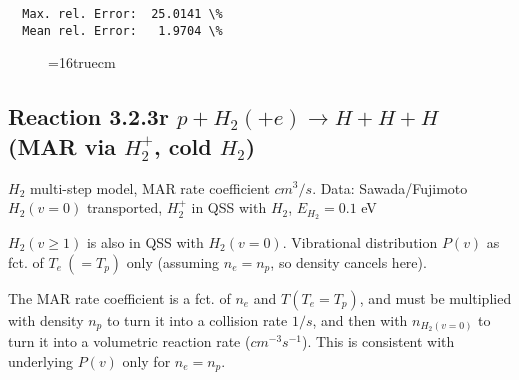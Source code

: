 \documentclass[12pt,dvipdfmx]{article}
\begin{document}
\begin{small}
\begin{verbatim}
  Max. rel. Error:  25.0141 \%
  Mean rel. Error:   1.9704 \%

\end{verbatim}\end{small}
\begin{figure} \label{2.3.18B1}
\epsfxsize=16truecm
\end{figure}
\newpage

\subsection{
Reaction 3.2.3r   $p + H_2 (+e)   \rightarrow H + H + H  $ (MAR via $H_2^+$, cold $H_2$)
}

$H_2$ multi-step model, MAR rate coefficient $cm^3/s$.
Data: Sawada/Fujimoto \cite{kn:Sawada}
$H_2(v=0)$ transported, $H_2^+$ in QSS with $H_2$, $E_{H_2}=0.1$ eV

$H_2(v\geq 1)$ is also in QSS with $H_2(v=0)$. Vibrational distribution $P(v)$ as fct. of $T_e~(=T_p)$ only (assuming $n_e=n_p$, so density cancels here).

The MAR rate coefficient is a fct. of $n_e$ and $T (T_e=T_p)$, and must be multiplied with density $n_p$ to turn it into a collision rate $1/s$,
and then with $n_{H_2(v=0)}$ to turn it into a volumetric reaction rate ($cm^{-3}s^{-1}$). This is consistent with underlying $P(v)$ only
for $n_e=n_p$.
\end{document}
